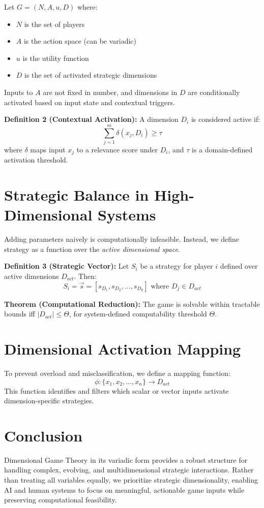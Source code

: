 \documentclass[12pt]{article}
\begin{document}
Let $G = (N, A, u, D)$ where:
\begin{itemize}
  \item $N$ is the set of players
  \item $A$ is the action space (can be variadic)
  \item $u$ is the utility function
  \item $D$ is the set of activated strategic dimensions
\end{itemize}

Inputs to $A$ are not fixed in number, and dimensions in $D$ are conditionally activated based on input state and contextual triggers.

\textbf{Definition 2 (Contextual Activation):} A dimension $D_i$ is considered active if:
\begin{equation}
\sum_{j=1}^{m} \delta(x_j, D_i) \geq \tau
\end{equation}
where $\delta$ maps input $x_j$ to a relevance score under $D_i$, and $\tau$ is a domain-defined activation threshold.

\section{Strategic Balance in High-Dimensional Systems}

Adding parameters naively is computationally infeasible. Instead, we define strategy as a function over the \textit{active dimensional space}.

\textbf{Definition 3 (Strategic Vector):} Let $S_i$ be a strategy for player $i$ defined over active dimensions $D_{act}$. Then:
\begin{equation}
S_i = \vec{s} = [s_{D_1}, s_{D_2}, ..., s_{D_k}] \text{ where } D_j \in D_{act}
\end{equation}

\textbf{Theorem (Computational Reduction):} The game is solvable within tractable bounds iff $|D_{act}| \leq \Theta$, for system-defined computability threshold $\Theta$.

\section{Dimensional Activation Mapping}
To prevent overload and misclassification, we define a mapping function:
\begin{equation}
\phi: \{x_1, x_2, ..., x_n\} \rightarrow D_{act}
\end{equation}
This function identifies and filters which scalar or vector inputs activate dimension-specific strategies.

\section{Conclusion}
Dimensional Game Theory in its variadic form provides a robust structure for handling complex, evolving, and multidimensional strategic interactions. Rather than treating all variables equally, we prioritize strategic dimensionality, enabling AI and human systems to focus on meaningful, actionable game inputs while preserving computational feasibility.
\end{document}

